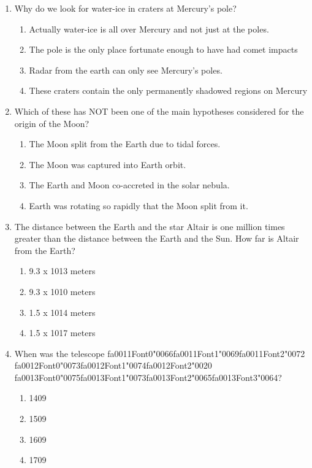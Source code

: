 \documentclass[12pt]{article}
\begin{document}
\begin{enumerate}[label=\arabic*.]
\begin{enumerate}[label=(\alph*)]
    \item A and B
\end{enumerate}
\item Why do we look for water-ice in craters at Mercury's pole?
\begin{enumerate}[label=(\alph*)]
    \item Actually water-ice is all over Mercury and not just at the poles.
    \item The pole is the only place fortunate enough to have had comet impacts
    \item Radar from the earth can only see Mercury's poles.
    \item These craters contain the only permanently shadowed regions on Mercury
\end{enumerate}
\item Which of these has NOT been one of the main hypotheses considered for the origin of the
Moon?
\begin{enumerate}[label=(\alph*)]
    \item The Moon split from the Earth due to tidal forces.
    \item The Moon was captured into Earth orbit.
    \item The Earth and Moon co-accreted in the solar nebula.
    \item Earth was rotating so rapidly that the Moon split from it.
\end{enumerate}
\item The distance between the Earth and the star Altair is one million times greater than the
distance between the Earth and the Sun. How far is Altair from the Earth?
\begin{enumerate}[label=(\alph*)]
    \item 9.3 x 1013 meters
    \item 9.3 x 1010 meters
    \item 1.5 x 1014 meters
    \item 1.5 x 1017 meters
\end{enumerate}
\item When was the telescope {\csname fa0011Font0\endcsname\char"0066}{\csname fa0011Font1\endcsname\char"0069}{\csname fa0011Font2\endcsname\char"0072} {\csname fa0012Font0\endcsname\char"0073}{\csname fa0012Font1\endcsname\char"0074}{\csname fa0012Font2\endcsname\char"0020} {\csname fa0013Font0\endcsname\char"0075}{\csname fa0013Font1\endcsname\char"0073}{\csname fa0013Font2\endcsname\char"0065}{\csname fa0013Font3\endcsname\char"0064}?
\begin{enumerate}[label=(\alph*)]
    \item 1409
    \item 1509
    \item 1609
    \item 1709
\end{enumerate}
\end{enumerate}
\end{document}
